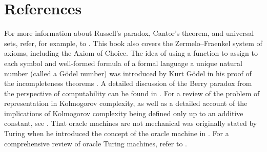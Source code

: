 %
%

\section{References}

For more information about Russell's paradox, Cantor's theorem, and universal sets, refer, for example, to \cite{jech2013set}. This book also covers the Zermelo–Fraenkel system of axioms, including the Axiom of Choice. The idea of using a function to assign to each symbol and well-formed formula of a formal language a unique natural number (called a Gödel number) was introduced by Kurt Gödel in his proof of the incompleteness theorems \cite{godel1931formal}. A detailed discussion of the Berry paradox from the perspective of computability can be found in \cite{chaitin1995berry}. For a review of the problem of representation in Kolmogorov complexity, as well as a detailed account of the implications of Kolmogorov complexity being defined only up to an additive constant, see \cite{li2013introduction}. That oracle machines are not mechanical was originally stated by Turing when he introduced the concept of the oracle machine in \cite{turing1939systems}. For a comprehensive review of oracle Turing machines, refer to \cite{robivc2015foundations}.
